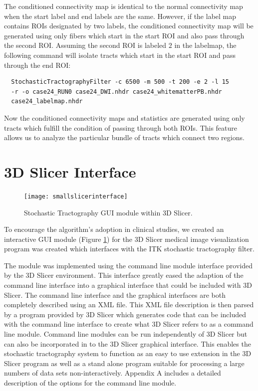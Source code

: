The conditioned connectivity map is identical to the normal connectivity map when the start label and end labels are the same.  However, if the label map contains ROIs designated by two labels, the conditioned connectivity map will be generated using only fibers which start in the start ROI and also pass through the second ROI.  Assuming the second ROI is labeled $2$ in the labelmap, the following command will isolate tracts which start in the start ROI and pass through the end ROI:
\begin{verbatim}
  StochasticTractographyFilter -c 6500 -m 500 -t 200 -e 2 -l 15
  -r -o case24_RUN0 case24_DWI.nhdr case24_whitematterPB.nhdr
  case24_labelmap.nhdr
\end{verbatim}

Now the conditioned connectivity maps and statistics are generated using only tracts which fulfill the condition of passing through both ROIs.  This feature allows us to analyze the particular bundle of tracts which connect two regions.
 
\section{3D Slicer Interface}
\begin{figure}[t]
  \center
	\texttt{[image: smallslicerinterface]}
	\caption{Stochastic Tractography GUI module within 3D Slicer.}
	\label{fig:slicermodule}
\end{figure}
To encourage the algorithm's adoption in clinical studies, we created an interactive GUI module (Figure \ref{fig:slicermodule}) for the 3D Slicer medical image visualization program was created which interfaces with the ITK stochastic tractography filter.

The module was implemented using the command line module interface provided by the 3D Slicer environment.  This interface greatly eased the adaption of the command line interface into a graphical interface that could be included with 3D Slicer.  The command line interface and the graphical interfaces are both completely described using an XML file.  This XML file description is then parsed by a program provided by 3D Slicer which generates code that can be included with the command line interface to create what 3D Slicer refers to as a command line module.  Command line modules can be run independently of 3D Slicer but can also be incorporated in to the 3D Slicer graphical interface.  This enables the stochastic tractography system to function as an easy to use extension in the 3D Slicer program as well as a stand alone program suitable for processing a large numbers of data sets non-interactively.  Appendix A includes a detailed description of the options for the command line module.


